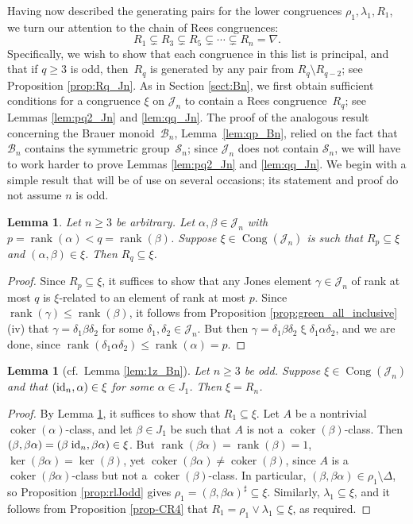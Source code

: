 \documentclass[11pt,a4paper]{article}
\renewcommand{\S}{\mathcal S}
\newcommand{\B}{\mathcal B}
\newcommand{\J}{\mathcal J}
\newcommand{\al}{\alpha}
\newcommand{\be}{\beta}
\newcommand{\ga}{\gamma}
\newcommand{\de}{\delta}
\newcommand{\lam}{\lambda}
\newcommand{\Cong}{\operatorname{Cong}}
\newcommand{\coker}{\operatorname{coker}}
\newcommand{\rank}{\operatorname{rank}}
\newcommand{\cg}[2]{(#1,#2)^\sharp}
\newcommand{\1}{\id_n}
\newcommand{\sm}{\setminus}
\newcommand{\sub}{\subseteq}
\newcommand{\suq}{\subsetneq}
\newcommand{\pf}{\begin{proof}}
\newcommand{\epf}{\end{proof}}
\numberwithin{equation}{section}
\newtheorem{lemma}[equation]{Lemma}
\theoremstyle{definition}
\begin{document}
\begin{itemize}
\begin{itemize}
\begin{itemize}
\begin{itemize}
\begin{itemize}
\begin{itemize}
\begin{itemize}
\begin{itemize}
\begin{itemize}
\begin{itemize}
\begin{itemize}
Having now described the generating pairs for the lower congruences $\rho_1,\lam_1,R_1$, we turn our attention to the chain of Rees congruences:
\[
R_1\suq R_3\suq R_5\suq\cdots\suq R_n=\nabla.
\]
Specifically, we wish to show that each congruence in this list is principal, and that if $q\geq3$ is odd, then~$R_q$ is generated by any pair from $R_q\sm R_{q-2}$; see Proposition \ref{prop:Rq_Jn}.
%
As in Section \ref{sect:Bn}, we first obtain sufficient conditions for a congruence $\xi$ on $\J_n$ to contain a Rees congruence~$R_q$; see Lemmas \ref{lem:pq2_Jn} and \ref{lem:qq_Jn}.
%
The proof of the analogous result concerning the Brauer monoid~$\B_n$, Lemma~\ref{lem:qp_Bn}, relied on the fact that $\B_n$ contains the symmetric group~$\S_n$; since $\J_n$ does not contain $\S_n$, we will have to work harder to prove Lemmas \ref{lem:pq2_Jn} and \ref{lem:qq_Jn}.
%
We begin with a simple result that will be of use on several occasions; its statement and proof do not assume $n$ is odd.



\begin{lemma}\label{lem:pq_Jn}
Let $n\geq3$ be arbitrary.  Let $\al,\be\in\J_n$ with $p=\rank(\al)<q=\rank(\be)$.  Suppose ${\xi\in\Cong(\J_n)}$ is such that $R_p\sub\xi$ and $(\al,\be)\in\xi$.  Then $R_q\sub\xi$.
\end{lemma}

\pf Since $R_p\sub\xi$, it suffices to show that any Jones element $\ga\in\J_n$ of rank at most $q$ is $\xi$-related to an element of rank at most $p$.  Since $\rank(\ga)\leq\rank(\be)$, it follows from Proposition \ref{prop:green_all_inclusive}(iv) that $\ga=\de_1\be\de_2$ for some $\de_1,\de_2\in\J_n$.  But then $\ga=\de_1\be\de_2 \mathrel\xi \de_1\al\de_2$, and we are done, since $\rank(\de_1\al\de_2)\leq\rank(\al)=p$. \epf


%
\begin{lemma}[cf.~Lemma \ref{lem:1z_Bn}]
\label{lem:1z_Jn}
Let $n\geq3$ be odd.  Suppose $\xi\in\Cong(\J_n)$ and that $(\1,\al)\in\xi$ for some $\al\in J_1$.  Then $\xi=R_n$.
\end{lemma}

\pf By Lemma \ref{lem:pq_Jn}, it suffices to show that $R_1\sub\xi$.  Let $A$ be a nontrivial $\coker(\al)$-class, and let $\be\in J_1$ be such that $A$ is not a $\coker(\be)$-class.  Then $(\be,\be\al)=(\be\;\!\1,\be\al)\in\xi$.  But $\rank(\be\al)=\rank(\be)=1$, $\ker(\be\al)=\ker(\be)$, yet $\coker(\be\al)\not=\coker(\be)$, since $A$ is a $\coker(\be\al)$-class but not a $\coker(\be)$-class.  In particular, $(\be,\be\al)\in\rho_1\sm\Delta$, so Proposition \ref{prop:rlJodd} gives $\rho_1=\cg{\be}{\be\al}\sub\xi$.  Similarly, $\lambda_1\sub\xi$, and it follows from Proposition \ref{prop-CR4} that $R_1=\rho_1\vee\lam_1\sub\xi$, as required. \epf


\end{itemize}
\end{itemize}
\end{itemize}
\end{itemize}
\end{itemize}
\end{itemize}
\end{itemize}
\end{itemize}
\end{itemize}
\end{itemize}
\end{itemize}
\end{document}
